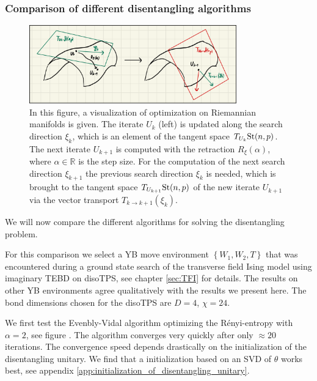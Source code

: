 \subsubsection*{Comparison of different disentangling algorithms}
\begin{figure}
	\centering
	\includegraphics[width=0.8\textwidth]{figures/disoTPS/disentangling_riemannian_optimization.jpeg}
	\caption{In this figure, a visualization of optimization on Riemannian manifolds is given. The iterate $U_k$ (left) is updated along the search direction $\xi_k$, which is an element of the tangent space $T_{U_k}\text{St}(n,p)$. The next iterate $U_{k+1}$ is computed with the retraction $R_\xi\left(\alpha\right)$, where $\alpha\in\mathbb{R}$ is the step size. For the computation of the next search direction $\xi_{k+1}$ the previous search direction $\xi_k$ is needed, which is brought to the tangent space $T_{U_{k+1}}\text{St}(n,p)$ of the new iterate $U_{k+1}$ via the vector transport $T_{k\rightarrow k+1}\left(\xi_k\right)$.}
	\label{fig:disentangling_riemannian_optimization}
\end{figure}
We will now compare the different algorithms for solving the disentangling problem.


For this comparison we select a YB move environment $\left\{W_1, W_2, T\right\}$ that was encountered during a ground state search of the transverse field Ising model using imaginary TEBD on disoTPS, see chapter \ref{sec:TFI} for details. The results on other YB environments agree qualitatively with the results we present here. The bond dimensions chosen for the disoTPS are $D = 4$, $\chi = 24$. \par
We first test the Evenbly-Vidal algorithm optimizing the Rényi-entropy with $\alpha = 2$, see figure . The algorithm converges very quickly after only $\approx 20$ iterations. The convergence speed depends drastically on the initialization of the disentangling unitary. We find that a initialization based on an SVD of $\theta$ works best, see appendix \ref{app:initialization_of_disentangling_unitary}. \par
